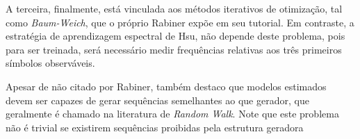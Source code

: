 \documentclass{subfiles}
\begin{document}
A terceira, finalmente, está vinculada aos métodos iterativos de otimização, tal como \textit{Baum-Weich}\autocite{Baum:1977tb01600}, que o próprio Rabiner expõe em seu tutorial\autocite{Rabiner:1989tut}. Em contraste, a estratégia de aprendizagem espectral de Hsu, não depende deste problema, pois para ser treinada, será necessário medir frequências relativas aos três primeiros símbolos observáveis.

Apesar de não citado por Rabiner, também destaco que modelos estimados devem ser capazes de gerar sequências semelhantes ao que gerador, que geralmente é chamado na literatura de \textit{Random Walk}. Note que este problema não é trivial se existirem sequências proibidas pela estrutura geradora
\end{document}

